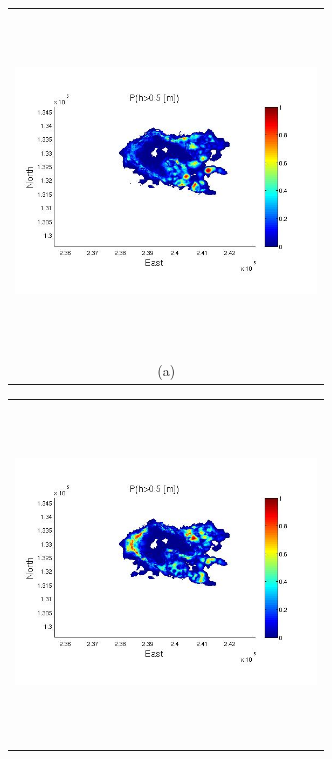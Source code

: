 \documentclass[12pt]{article}
\newcommand{\Pic}[2][0.85]{\begin{center}\texttt{[image: \#2]}
 \end{center} }
\begin{document}
\begin{figure}[H]
      \begin{minipage}[b]{0.6\textwidth}
        \begin{tabular}{c}
       \includegraphics[width=8cm,height=9cm,keepaspectratio]{figs/Galeras0_minus_Aster30.jpg}\\
        (a)
        \end{tabular}
    \end{minipage}
    \begin{minipage}{0.6\textwidth}
        \begin{tabular}{c}
	\includegraphics[width=8cm,height=9cm,keepaspectratio]{figs/Galeras3_minus_Aster30.jpg}\\

\end{tabular}
\end{minipage}
\end{figure}
\end{document}

